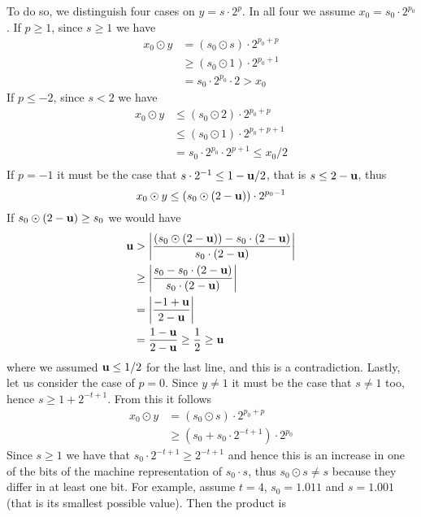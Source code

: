 \begin{example}
	To do so, we distinguish four cases on $y = s \cdot 2^p$. In all four we assume $x_0 = s_0 \cdot 2^{p_0}$.
	If $p \ge 1$, since $s \ge 1$ we have
	\begin{align*}
		x_0 \odot y &= (s_0 \odot s) \cdot 2^{p_0 + p} \\
		&\ge (s_0 \odot 1) \cdot 2^{p_0 + 1} \\
		&= s_0 \cdot 2^{p_0} \cdot 2 > x_0
	\end{align*}
	If $p \le -2$, since $s < 2$ we have
	\begin{align*}
		x_0 \odot y &\le (s_0 \odot 2) \cdot 2^{p_0 + p} \\
		&\le (s_0 \odot 1) \cdot 2^{p_0 + p + 1} \\
		&= s_0 \cdot 2^{p_0} \cdot 2^{p + 1} \le x_0 / 2\\
	\end{align*}
	If $p = -1$ it must be the case that $s \cdot 2^{-1} \le 1 - \textbf{u} / 2$, that is $s \le 2 - \textbf{u}$, thus
	\[
	x_0 \odot y \le (s_0 \odot (2 - \textbf{u})) \cdot 2^{p_0 - 1}
	\]
	If $s_0 \odot (2 - \textbf{u}) \ge s_0$ we would have
	\begin{align*}
		\textbf{u} &> \left\lvert \frac{(s_0 \odot (2 - \textbf{u})) - s_0 \cdot (2 - \textbf{u})}{s_0 \cdot (2 - \textbf{u})} \right\rvert \\
		&\ge \left\lvert \frac{s_0 - s_0 \cdot (2 - \textbf{u})}{s_0 \cdot (2 - \textbf{u})} \right\rvert \\
		&= \left\lvert \frac{- 1 + \textbf{u}}{2 - \textbf{u}} \right\rvert \\
		&= \frac{1 - \textbf{u}}{2 - \textbf{u}} \ge \frac{1}{2} \ge \textbf{u}\\
	\end{align*}
	where we assumed $\textbf{u} \le 1/2$ for the last line, and this is a contradiction.
	Lastly, let us consider the case of $p = 0$. Since $y \neq 1$ it must be the case that $s \neq 1$ too, hence $s \ge 1 + 2^{-t+1}$. From this it follows
	\begin{align*}
		x_0 \odot y &= (s_0 \odot s) \cdot 2^{p_0 + p} \\
		&\ge (s_0 + s_0 \cdot 2^{-t+1}) \cdot 2^{p_0}
	\end{align*}
	Since $s \ge 1$ we have that $s_0 \cdot 2^{-t+1} \ge 2^{-t+1}$ and hence this is an increase in one of the bits of the machine representation of $s_0 \cdot s$, thus $s_0 \odot s \neq s$ because they differ in at least one bit.
	For example, assume $t = 4$, $s_0 = 1.011$ and $s = 1.001$ (that is its smallest possible value). Then the product is
	\begin{center}

\end{center}
\end{example}
